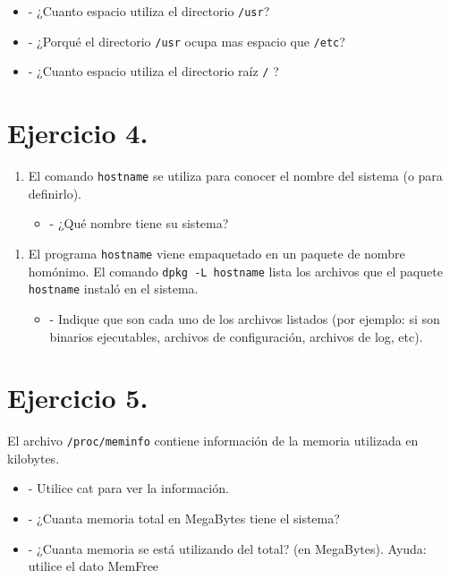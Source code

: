 \documentclass[12pt]{article}
\begin{document}
\begin{itemize}
\item - ¿Cuanto espacio utiliza el directorio \texttt{/usr}?
\item - ¿Porqué el directorio \texttt{/usr} ocupa mas espacio que \texttt{/etc}?
\item - ¿Cuanto espacio utiliza el directorio raíz \texttt{/} ?
\end{itemize}


\section{Ejercicio 4.}
\begin{enumerate}
\item El comando \texttt{hostname} se utiliza para conocer el nombre del sistema (o para definirlo).
\begin{itemize}
\item - ¿Qué nombre tiene su sistema?
\end{itemize}
\end{enumerate}

\begin{enumerate}
\item El programa \texttt{hostname} viene empaquetado en un paquete de nombre homónimo.
El comando \texttt{dpkg -L hostname}  lista los archivos que el paquete \texttt{hostname} instaló en el sistema.
\begin{itemize}
\item - Indique que son cada uno de los archivos listados (por ejemplo: si son binarios ejecutables, archivos de configuración, archivos de log, etc).
\end{itemize}
\end{enumerate}



\section{Ejercicio 5.}
El archivo \texttt{/proc/meminfo} contiene información de la memoria utilizada en kilobytes.

\begin{itemize}
\item - Utilice cat para ver la información.
\item - ¿Cuanta memoria total en MegaBytes tiene el sistema?
\item - ¿Cuanta memoria se está utilizando del total? (en MegaBytes). Ayuda: utilice el dato MemFree
\end{itemize}
\end{document}
